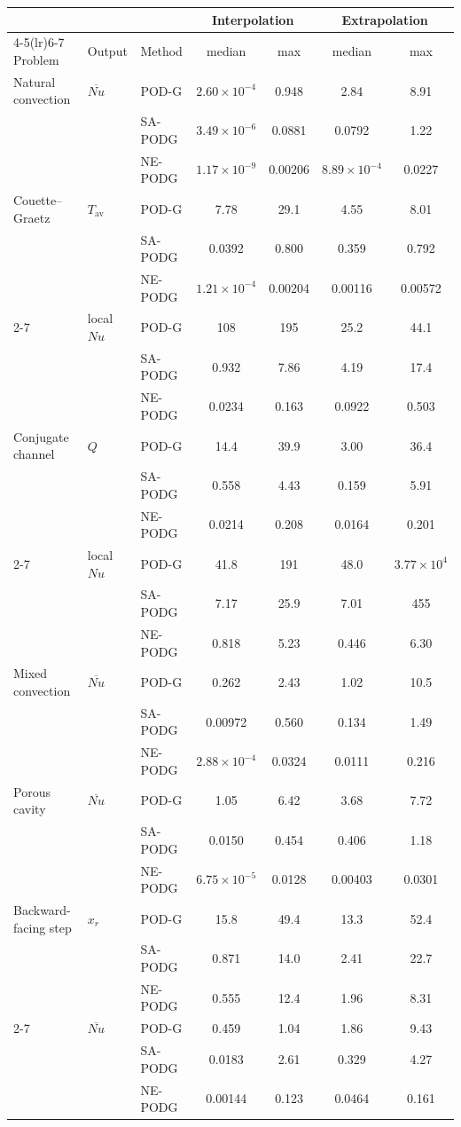 \begin{tabular}{lllcccc}
\toprule
 & & & \multicolumn{2}{c}{Interpolation} & \multicolumn{2}{c}{Extrapolation} \\
\cmidrule(lr){4-5}\cmidrule(lr){6-7}
Problem & Output & Method & median & max & median & max \\
\midrule
Natural convection & $\overline{Nu}$ & POD-G & $2.60\times10^{-4}$ & 0.948 & 2.84 & 8.91 \\
 &  & SA-PODG & $3.49\times10^{-6}$ & 0.0881 & 0.0792 & 1.22 \\
 &  & NE-PODG & $1.17\times10^{-9}$ & 0.00206 & $8.89\times10^{-4}$ & 0.0227 \\
\midrule
Couette--Graetz & $T_{\mathrm{av}}$ & POD-G & 7.78 & 29.1 & 4.55 & 8.01 \\
 &  & SA-PODG & 0.0392 & 0.800 & 0.359 & 0.792 \\
 &  & NE-PODG & $1.21\times10^{-4}$ & 0.00204 & 0.00116 & 0.00572 \\
\cmidrule(lr){2-7}
 & local $Nu$ & POD-G & 108 & 195 & 25.2 & 44.1 \\
 &  & SA-PODG & 0.932 & 7.86 & 4.19 & 17.4 \\
 &  & NE-PODG & 0.0234 & 0.163 & 0.0922 & 0.503 \\
\midrule
Conjugate channel & $Q$ & POD-G & 14.4 & 39.9 & 3.00 & 36.4 \\
 &  & SA-PODG & 0.558 & 4.43 & 0.159 & 5.91 \\
 &  & NE-PODG & 0.0214 & 0.208 & 0.0164 & 0.201 \\
\cmidrule(lr){2-7}
 & local $Nu$ & POD-G & 41.8 & 191 & 48.0 & $3.77\times10^{4}$ \\
 &  & SA-PODG & 7.17 & 25.9 & 7.01 & 455 \\
 &  & NE-PODG & 0.818 & 5.23 & 0.446 & 6.30 \\
\midrule
Mixed convection & $\overline{Nu}$ & POD-G & 0.262 & 2.43 & 1.02 & 10.5 \\
 &  & SA-PODG & 0.00972 & 0.560 & 0.134 & 1.49 \\
 &  & NE-PODG & $2.88\times10^{-4}$ & 0.0324 & 0.0111 & 0.216 \\
\midrule
Porous cavity & $\overline{Nu}$ & POD-G & 1.05 & 6.42 & 3.68 & 7.72 \\
 &  & SA-PODG & 0.0150 & 0.454 & 0.406 & 1.18 \\
 &  & NE-PODG & $6.75\times10^{-5}$ & 0.0128 & 0.00403 & 0.0301 \\
\midrule
Backward-facing step & $x_r$ & POD-G & 15.8 & 49.4 & 13.3 & 52.4 \\
 &  & SA-PODG & 0.871 & 14.0 & 2.41 & 22.7 \\
 &  & NE-PODG & 0.555 & 12.4 & 1.96 & 8.31 \\
\cmidrule(lr){2-7}
 & $\overline{Nu}$ & POD-G & 0.459 & 1.04 & 1.86 & 9.43 \\
 &  & SA-PODG & 0.0183 & 2.61 & 0.329 & 4.27 \\
 &  & NE-PODG & 0.00144 & 0.123 & 0.0464 & 0.161 \\
\bottomrule
\end{tabular}
